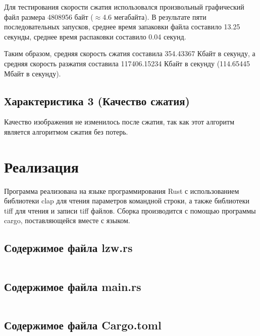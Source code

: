 \documentclass[a4paper,oneside]{article}
\theoremstyle{definition}
\begin{document}
Для тестирования скорости сжатия использовался произвольный графический
файл размера 4808956 байт ($\approx$4.6 мегабайта). В результате пяти
последовательных запусков, среднее время запаковки файла составило 13.25
секунды, среднее время распаковки составило 0.04 секунд.

Таким образом, средняя скорость сжатия составила 354.43367 Кбайт в секунду, а
средняя скорость разжатия составила 117406.15234 Кбайт в секунду (114.65445
Мбайт в секунду).

\subsection{Характеристика 3 (Качество сжатия)}

Качество изображения не изменилось после сжатия, так как этот алгоритм является
алгоритмом сжатия без потерь.

\section{Реализация}

Программа реализована на языке программирования Rust с использованием библиотеки
clap для чтения параметров командной строки, а также библиотеки tiff для
чтения и записи tiff файлов. Сборка производится с помощью программы cargo,
поставляющейся вместе с языком.

\subsection{Содержимое файла lzw.rs}
\inputminted{rust}{../../lab11/src/lzw.rs}

\subsection{Содержимое файла main.rs}
\inputminted{rust}{../../lab11/src/main.rs}

\subsection{Содержимое файла Cargo.toml}
\inputminted{toml}{../../lab11/Cargo.toml}
\end{document}
